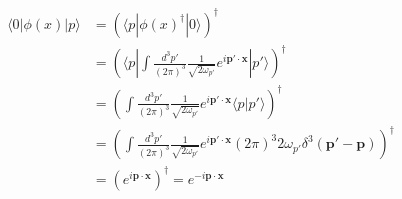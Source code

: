 \documentclass[working, oneside]{../../Preambles/tuftebook}
\begin{document}
\begin{solution}
\begin{align*}
    \langle 0 | \phi(x) | p \rangle &= \left( \langle p | \phi(x)^\dagger | 0 \rangle \right)^\dagger \\
                                    &= \left(\langle p | \int \frac{d^3p'}{(2\pi)^3} \frac{1}{\sqrt{2\omega_{p'}}} e^{i\mathbf{p}' \cdot \mathbf{x}} | p' \rangle   \right) ^\dagger \\
                                    &= \left(   \int \frac{d^3p'}{(2\pi)^3} \frac{1}{\sqrt{2\omega_{p'}}} e^{i\mathbf{p}' \cdot \mathbf{x}} \langle p | p' \rangle\right)^\dagger \\
                                    &= \left(   \int \frac{d^3p'}{(2\pi)^3} \frac{1}{\sqrt{2\omega_{p'}}} e^{i\mathbf{p}' \cdot \mathbf{x}} (2\pi)^3 2\omega_{p'} \delta^3(\mathbf{p}' - \mathbf{p})\right)^\dagger \\
                                    &= \left( e^{i\mathbf{p} \cdot \mathbf{x}} \right)^\dagger = e^{-i\mathbf{p} \cdot \mathbf{x}}
\end{align*}
\end{solution}
\end{document}
